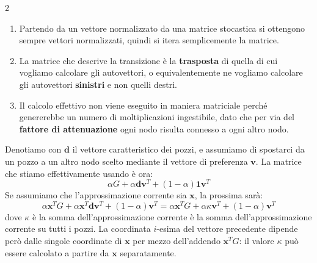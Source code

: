 \documentclass[\main/main.tex]{subfiles}
\begin{document}
\begin{multicols}{2}
\begin{observation}
    \begin{enumerate}
        \item Partendo da un vettore normalizzato da una matrice stocastica si ottengono sempre vettori normalizzati, quindi si itera semplicemente la matrice.
        \item La matrice che descrive la transizione è la \textbf{trasposta} di quella di cui vogliamo calcolare gli autovettori, o equivalentemente ne vogliamo calcolare gli autovettori \textbf{sinistri} e non quelli destri.
        \item Il calcolo effettivo non viene eseguito in maniera matriciale perché genererebbe un numero di moltiplicazioni ingestibile, dato che per via del \textbf{fattore di attenuazione} ogni nodo risulta connesso a ogni altro nodo.
    \end{enumerate}
\end{observation}
\begin{observation}
    Denotiamo con \(\bm{d}\) il vettore caratteristico dei pozzi, e assumiamo di spostarci da un pozzo a un altro nodo scelto mediante il vettore di preferenza \(\bm{v}\). La matrice che stiamo effettivamente usando è ora:
    \[
        \alpha G+\alpha \bm{d} \bm{v}^{T}+(1-\alpha) \bm{1} \bm{v}^{T}
    \]
    Se assumiamo che l'approssimazione corrente sia \(\bm{x}\), la prossima sarà:
    \[
        \alpha \boldsymbol{x}^{T} G+\alpha \boldsymbol{x}^{T} \boldsymbol{d} \boldsymbol{v}^{T}+(1-\alpha) \boldsymbol{v}^{T}=\alpha \boldsymbol{x}^{T} G+\alpha \kappa \boldsymbol{v}^{T}+(1-\alpha) \boldsymbol{v}^{T}
    \]
    dove \(\kappa\) è la somma dell'approssimazione corrente è la somma dell'approssimazione corrente su tutti i pozzi. La coordinata \(i\)-esima del vettore precedente dipende però dalle singole coordinate di \(\bm{x}\) per mezzo dell'addendo \(\boldsymbol{x}^{T} G\): il valore \(\kappa\) può essere calcolato a partire da \(\bm{x}\) separatamente.
    

\end{observation}
\end{multicols}
\end{document}

